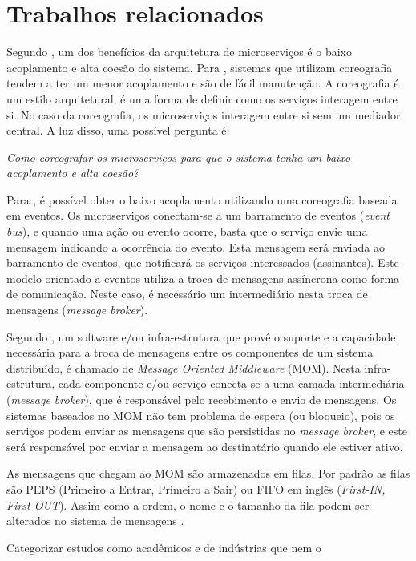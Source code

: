 \documentclass[12pt]{article}
\theoremstyle{plain}
\begin{document}
\section{Trabalhos relacionados}
\label{sec:trabalhos-relacionados}

Segundo \cite{wolf:2018}, um dos benefícios da arquitetura de microserviços é o baixo acoplamento e alta coesão do sistema. Para \cite{Newman:15}, sistemas que utilizam coreografia tendem a ter um menor acoplamento e são de fácil manutenção. A coreografia é um estilo arquitetural, é uma forma de definir como os serviços interagem entre si. No caso da coreografia, os microserviços interagem entre si sem um mediador central. A luz disso, uma possível pergunta é:

\emph{Como coreografar os microserviços para que o sistema tenha um baixo acoplamento e alta coesão?}

Para \cite{damore:2018}, é possível obter o baixo acoplamento utilizando uma coreografia baseada em eventos. Os microserviços conectam-se a um barramento de eventos (\textit{event bus}), e quando uma ação ou evento ocorre, basta que o serviço envie uma mensagem indicando a ocorrência do evento. Esta mensagem será enviada ao barramento de eventos, que notificará os serviços interessados (assinantes). Este modelo orientado a eventos utiliza a troca de mensagens assíncrona como forma de comunicação. Neste caso, é necessário um intermediário nesta troca de mensagens (\textit{message broker}). 

Segundo \cite{Curry2004}, um software e/ou infra-estrutura que provê o suporte e a capacidade necessária para a troca de mensagens entre os componentes de um sistema distribuído, é chamado de \textit{Message Oriented Middleware} (MOM). Nesta infra-estrutura, cada componente e/ou serviço conecta-se a uma camada intermediária (\textit{message broker}), que é responsável pelo recebimento e envio de mensagens. Os sistemas baseados no MOM não tem problema de espera (ou bloqueio), pois os serviços podem enviar as mensagens que são persistidas no \textit{message broker}, e este será responsável por enviar a mensagem ao destinatário quando ele estiver ativo.

As mensagens que chegam ao MOM são armazenados em filas. Por padrão as filas são PEPS (Primeiro a Entrar, Primeiro a Sair) ou FIFO em inglês (\textit{First-IN, First-OUT}). Assim como a ordem, o nome e o tamanho da fila podem ser alterados no sistema de mensagens \cite{Curry2004}.  


Categorizar estudos como acadêmicos e de indústrias que nem o \cite{francesco:2017}
\end{document}

